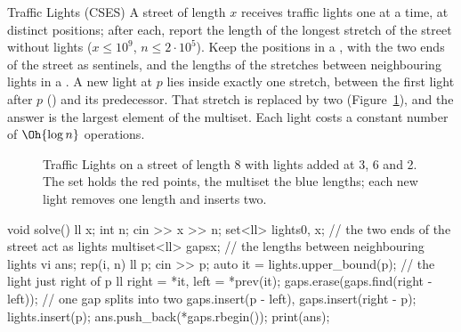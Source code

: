 \begin{problem}{Traffic Lights (CSES)}
A street of length $x$ receives traffic lights one at a time, at distinct positions; after each, report the length of the longest
stretch of the street without lights ($x \le 10^9$, $n \le 2 \cdot 10^5$).
\solution Keep the positions in a , with the two ends of the street as sentinels, and the lengths of the stretches between
neighbouring lights in a . A new light at $p$ lies inside exactly one stretch, between the first light after $p$
() and its predecessor. That stretch is replaced by two (Figure~\ref{fig:traffic}), and the answer is the largest
element of the multiset. Each light costs a constant number of $\Oh{\log n}$ operations.
\end{problem}

\begin{figure}[htbp]
\centering
{}
\caption{Traffic Lights on a street of length 8 with lights added at 3, 6 and 2. The set holds the red points, the multiset the
blue lengths; each new light removes one length and inserts two.}
\label{fig:traffic}
\end{figure}

\begin{code}
void solve() {
    ll x;
    int n;
    cin >> x >> n;
    set<ll> lights{0, x};  // the two ends of the street act as lights
    multiset<ll> gaps{x};  // the lengths between neighbouring lights
    vi ans;
    rep(i, n) {
        ll p;
        cin >> p;
        auto it = lights.upper_bound(p);  // the light just right of p
        ll right = *it, left = *prev(it);
        gaps.erase(gaps.find(right - left));  // one gap splits into two
        gaps.insert(p - left), gaps.insert(right - p);
        lights.insert(p);
        ans.push_back(*gaps.rbegin());
    }
    print(ans);
}
\end{code}

